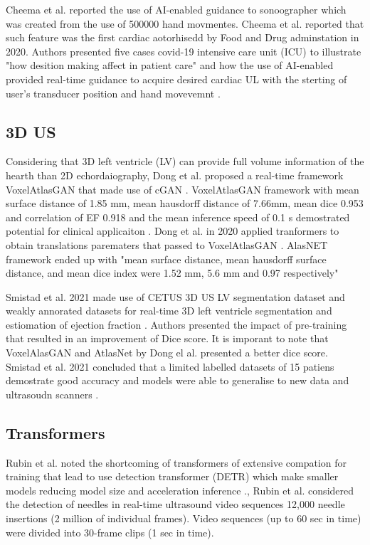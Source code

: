 Cheema et al. reported the use of AI-enabled guidance to sonoographer which was created from the use of 500000 hand movmentes.
Cheema et al.  reported that such feature was the first cardiac aotorhisedd by Food and Drug adminstation in 2020. 
Authors presented five cases covid-19 intensive care unit (ICU) to illustrate "how desition making affect in patient care" and how the use of AI-enabled provided real-time guidance to acquire desired cardiac UL with the sterting of user's transducer position and hand movevemnt \cite{CHEEMA2021JACCCaseReports}.



\subsection{3D US}
Considering that 3D left ventricle (LV) can provide full volume information of the hearth than 2D echordaiography,  Dong et al. proposed a real-time framework VoxelAtlasGAN that made use of cGAN \cite{dong2018-MICCAI}. 
VoxelAtlasGAN framework with mean surface distance of 1.85 mm, mean hausdorff distance of 7.66mm, mean dice 0.953 and correlation of EF 0.918 and the mean inference speed of 0.1 s demostrated potential for clinical applicaiton \cite{dong2018-MICCAI}.
Dong et al. in 2020 applied tranformers to obtain translations parematers that passed to VoxelAtlasGAN \cite{dong2020-MIA}.
AlasNET framework  ended up with "mean surface distance, mean hausdorff surface distance, and mean dice index were 1.52 mm, 5.6 mm and 0.97 respectively" \cite{dong2020-MIA}

Smistad et al. 2021 made use of CETUS 3D US LV segmentation dataset and weakly annorated datasets for real-time 3D left ventricle segmentation and estiomation of ejection fraction \cite{smistad2021-D-IUS}.
Authors presented the impact of pre-training that resulted in an improvement of Dice score. 
It is imporant to note that VoxelAlasGAN and AtlasNet by Dong el al. presented a better dice score.
Smistad et al. 2021 concluded that a limited labelled datasets of 15 patiens demostrate good accuracy and models were able to generalise to new data and ultrasoudn scanners \cite{smistad2021-D-IUS}.




\subsection{Transformers}

Rubin et al. noted the shortcoming of transformers of extensive compation for training that lead to use detection transformer (DETR) which make smaller models reducing model size and acceleration inference \cite{rubin2021-PMLH}.,
Rubin et al. considered the detection of needles in real-time ultrasound video sequences 12,000 needle insertions (2 million of individual frames).
Video sequences (up to 60 sec in time) were divided into 30-frame clips (1 sec in time).


